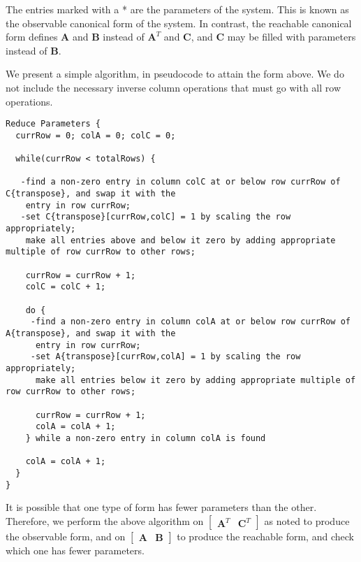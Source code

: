     The entries marked with a * are the parameters of the system.
This is known as the observable canonical form of the system. In
contrast, the reachable canonical form defines $\mathbf{A}$ and
$\mathbf{B}$ instead of $\mathbf{A}^T$ and $\mathbf{C}$, and
$\mathbf{C}$ may be filled with parameters instead of
$\mathbf{B}$.

    We present a simple algorithm, in pseudocode to attain the form
above. We do not include the necessary inverse column operations
that must go with all row operations.

\begin{scriptsize}
\begin{singlespace}
\begin{verbatim}
Reduce Parameters {
  currRow = 0; colA = 0; colC = 0;

  while(currRow < totalRows) {

   -find a non-zero entry in column colC at or below row currRow of C{transpose}, and swap it with the
    entry in row currRow;
   -set C{transpose}[currRow,colC] = 1 by scaling the row appropriately;
    make all entries above and below it zero by adding appropriate multiple of row currRow to other rows;

    currRow = currRow + 1;
    colC = colC + 1;

    do {
     -find a non-zero entry in column colA at or below row currRow of A{transpose}, and swap it with the
      entry in row currRow;
     -set A{transpose}[currRow,colA] = 1 by scaling the row appropriately;
      make all entries below it zero by adding appropriate multiple of row currRow to other rows;

      currRow = currRow + 1;
      colA = colA + 1;
    } while a non-zero entry in column colA is found

    colA = colA + 1;
  }
}
\end{verbatim}
\end{singlespace}
\end{scriptsize}

    It is possible that one type of form has fewer parameters than the
other. Therefore, we perform the above algorithm on $\left [
\begin{array} {cc} \mathbf{A}^T & \mathbf{C}^T
\end{array} \right ]$ as noted to produce the observable form, and on $\left [
\begin{array} {cc} \mathbf{A} & \mathbf{B} \end{array} \right
]$ to produce the reachable form, and check which one has fewer
parameters.

